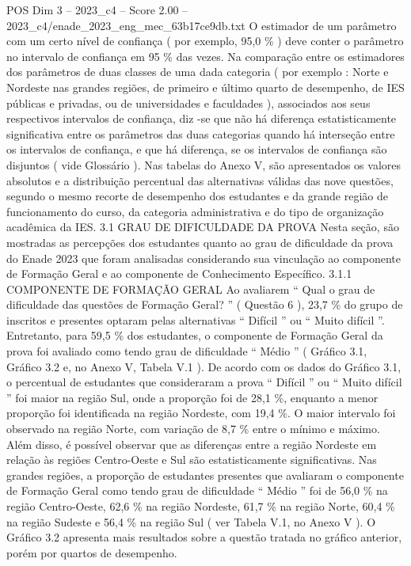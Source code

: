 \begin{textsample}{POS Dim 3 – 2023\_c4 – Score 2.00 – 2023\_c4/enade\_2023\_eng\_mec\_63b17ce9db.txt}
O estimador de um parâmetro com um certo nível de confiança ( por exemplo, 95,0 \% ) deve conter o parâmetro no intervalo de confiança em 95 \% das vezes.
Na comparação entre os estimadores dos parâmetros de duas classes de uma dada categoria ( por exemplo : Norte e Nordeste nas grandes regiões, de primeiro e último quarto de desempenho, de IES públicas e privadas, ou de universidades e faculdades ), associados aos seus respectivos intervalos de confiança, diz -se que não há diferença estatisticamente significativa entre os parâmetros das duas categorias quando há interseção entre os intervalos de confiança, e que há diferença, se os intervalos de confiança são disjuntos ( vide Glossário ).
Nas tabelas do Anexo V, são apresentados os valores absolutos e a distribuição percentual das alternativas válidas das nove questões, segundo o mesmo recorte de desempenho dos estudantes e da grande região de funcionamento do curso, da categoria administrativa e do tipo de organização acadêmica da IES. 3.1 GRAU DE DIFICULDADE DA PROVA Nesta seção, são mostradas as percepções dos estudantes quanto ao grau de dificuldade da prova do Enade 2023 que foram analisadas considerando sua vinculação ao componente de Formação Geral e ao componente de Conhecimento Específico. 3.1.1 COMPONENTE DE FORMAÇÃO GERAL Ao avaliarem “ Qual o grau de dificuldade das questões de Formação Geral? ” ( Questão 6 ), 23,7 \% do grupo de inscritos e presentes optaram pelas alternativas “ Difícil ” ou “ Muito difícil ”.
Entretanto, para 59,5 \% dos estudantes, o componente de Formação Geral da prova foi avaliado como tendo grau de dificuldade “ Médio ” ( Gráfico 3.1, Gráfico 3.2 e, no Anexo V, Tabela V.1 ).
De acordo com os dados do Gráfico 3.1, o percentual de estudantes que consideraram a prova “ Difícil ” ou “ Muito difícil ” foi maior na região Sul, onde a proporção foi de 28,1 \%, enquanto a menor proporção foi identificada na região Nordeste, com 19,4 \%.
O maior intervalo foi observado na região Norte, com variação de 8,7 \% entre o mínimo e máximo.
Além disso, é possível observar que as diferenças entre a região Nordeste em relação às regiões Centro-Oeste e Sul são estatisticamente significativas.
Nas grandes regiões, a proporção de estudantes presentes que avaliaram o componente de Formação Geral como tendo grau de dificuldade “ Médio ” foi de 56,0 \% na região Centro-Oeste, 62,6 \% na região Nordeste, 61,7 \% na região Norte, 60,4 \% na região Sudeste e 56,4 \% na região Sul ( ver Tabela V.1, no Anexo V ).
O Gráfico 3.2 apresenta mais resultados sobre a questão tratada no gráfico anterior, porém por quartos de desempenho.

\end{textsample}
